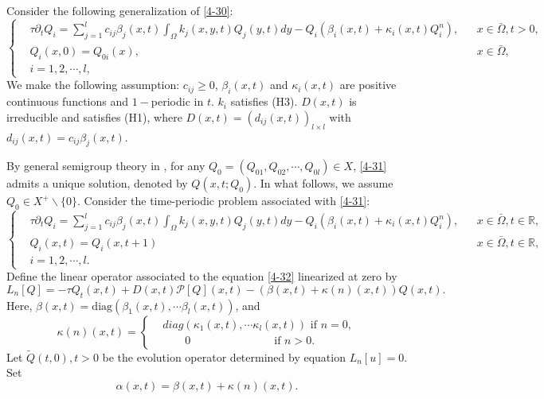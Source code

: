 \documentclass[11pt,reqno]{amsart}
\numberwithin{equation}{section}
\begin{document}
Consider the following generalization of \eqref{4-30}:
\begin{equation}\label{4-31}
\left\{
\begin{aligned}
&\tau\partial_t Q_i =
\sum_{j=1}^{l} c_{ij}\beta_{j}(x,t)\int_{\Omega}k_{j}(x,y,t)Q_{j}(y,t)dy  -Q_i(\beta_i(x,t) + \kappa_i(x,t)Q_{i}^{n}), &&x\in\bar\Omega, t>0,\\
&Q_{i}(x,0) = Q_{0i}(x), &&x\in\bar\Omega, \\
&i=1,2, \cdots, l,
\end{aligned}
\right.
\end{equation}
We make the following assumption:
$c_{ij}\geq 0$, $\beta_{i}(x,t)$ and $\kappa_{i}(x,t)$ are positive continuous functions and $1-$periodic in $t$. $k_{i}$ satisfies (H3).
$D(x,t)$ is irreducible and satisfies (H1), where
$D(x,t)= (d_{ij}(x,t))_{l\times l}$ with $d_{ij}(x,t)=c_{ij}\beta_{j}(x,t)$.


By general semigroup theory in \cite{Pazy}, for any $Q_{0} = (Q_{01},Q_{02},\cdots,Q_{0l}) \in X$,
\eqref{4-31} admits a unique solution, denoted by $Q(x,t;Q_{0})$.
In what follows, we assume $Q_{0}\in X^{+}\backslash\{ 0 \}$.
Consider the time-periodic problem associated with \eqref{4-31}:
\begin{equation}\label{4-32}
\left\{
\begin{aligned}
&\tau\partial_t Q_i =
\sum_{j=1}^{l} c_{ij}\beta_{j}(x,t)\int_{\Omega}k_{j}(x,y,t)Q_{j}(y,t)dy  -Q_i(\beta_i(x,t) + \kappa_i(x,t)Q_{i}^{n}),&&x\in\bar\Omega, t\in\mathbb{R},\\
&Q_{i}(x,t)= Q_{i}(x,t+1)&&x\in\bar\Omega, t\in\mathbb{R},\\
&i=1,2, \cdots, l.
\end{aligned}
\right.
\end{equation}
Define the linear operator associated to the equation \eqref{4-32} linearized at zero by
\begin{equation*}
L_{n}[Q] = -\tau Q_{t}(x,t) + D(x,t)\mathcal{P}[Q](x,t) - (\beta(x,t)+ \kappa(n)(x,t))Q(x,t).
\end{equation*}
Here, $\beta(x,t) = \text{diag}(\beta_{1}(x,t),\cdots\beta_{l}(x,t))$, and
\begin{equation*}
\kappa(n)(x,t) =
\begin{cases}
&\!\!\!\!\!diag(\kappa_1(x,t),\cdots \kappa_l(x,t) ) \text{ if } n=0,
\\
&\qquad 0 \qquad\qquad\quad\,\qquad \text{ if } n>0.
\end{cases}
\end{equation*}
Let $\tilde{Q}(t,0),t>0$ be the evolution operator determined by equation $L_{n}[u]=0$.
Set $$\alpha(x,t) = \beta(x,t)+ \kappa(n)(x,t).$$
\end{document}
